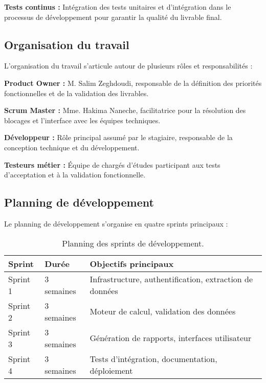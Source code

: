 \textbf{Tests continus :} Intégration des tests unitaires et d'intégration dans le processus de développement pour garantir la qualité du livrable final.

\subsection{Organisation du travail}

L'organisation du travail s'articule autour de plusieurs rôles et responsabilités :

\medskip

\textbf{Product Owner :} M. Salim Zeghdoudi, responsable de la définition des priorités fonctionnelles et de la validation des livrables.

\textbf{Scrum Master :} Mme. Hakima Naneche, facilitatrice pour la résolution des blocages et l'interface avec les équipes techniques.

\textbf{Développeur :} Rôle principal assumé par le stagiaire, responsable de la conception technique et du développement.

\textbf{Testeurs métier :} Équipe de chargés d'études participant aux tests d'acceptation et à la validation fonctionnelle.

\subsection{Planning de développement}

Le planning de développement s'organise en quatre sprints principaux :

\begin{table}[h]
    \centering
    \begin{tabular}{|l|l|l|}
        \hline
        \textbf{Sprint} & \textbf{Durée} & \textbf{Objectifs principaux}                           \\ \hline
        Sprint 1        & 3 semaines     & Infrastructure, authentification, extraction de données \\ \hline
        Sprint 2        & 3 semaines     & Moteur de calcul, validation des données                \\ \hline
        Sprint 3        & 3 semaines     & Génération de rapports, interfaces utilisateur          \\ \hline
        Sprint 4        & 3 semaines     & Tests d'intégration, documentation, déploiement         \\ \hline
    \end{tabular}
    \caption{Planning des sprints de développement.}
    \label{tab:planning-sprints}
\end{table}

